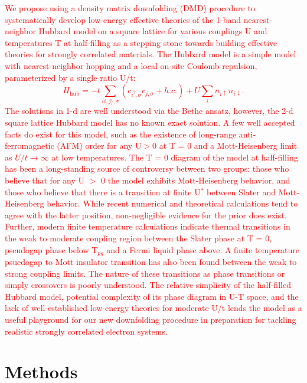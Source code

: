 \documentclass[12pt]{article}
\begin{document}
\textcolor{red}{
We propose using a density matrix downfolding (DMD) procedure to systematically develop low-energy effective theories of the 1-band nearest-neighbor Hubbard model on a square lattice for various couplings U and temperatures T at half-filling as a stepping stone towards building effective theories for strongly correlated materials. 
The Hubbard model is a simple model with nearest-neighbor hopping and a local on-site Coulomb repulsion, parameterized by a single ratio U/t: 
\begin{equation}
H_\text{hub} = -t \sum_{\langle i,j \rangle,\sigma}( c_{i^\dagger,\sigma} c_{j,\sigma} + h.c.) + U \sum_i n_{i\uparrow} n_{i\downarrow}
\label{hubbard}.
\end{equation}
The solutions in 1-d are well understood via the Bethe ansatz, however, the 2-d square lattice Hubbard model has no known exact solution.  
A few well accepted facts do exist for this model, such as the existence of long-range anti-ferromagnetic (AFM) order for any U$>$0 at T = 0 and a Mott-Heisenberg limit as $U/t \rightarrow \infty$ at low temperatures.
The T = 0 diagram of the model at half-filling has been a long-standing source of controversy between two groups:  those who believe that for any U $>$ 0 the model exhibits Mott-Heisenberg behavior, and those who believe that there is a transition at finite U$^*$ between Slater and Mott-Heisenberg behavior.
While recent numerical and theoretical calculations tend to agree with the latter position, non-negligible evidence for the prior does exist. 
Further, modern finite temperature calculations indicate thermal transitions in the weak to moderate coupling region between the Slater phase at T = 0, pseudogap phase below T$_{pg}$ and a Fermi liquid phase above.
A finite temperature psuedogap to Mott insulator transition has also been found between the weak to strong coupling limits.
The nature of these transitions as phase transitions or simply crossovers is poorly understood.
The relative simplicity of the half-filled Hubbard model, potential complexity of its phase diagram in U-T space,  and the lack of well-established low-energy theories for moderate U/t lends the model as a useful playground for our new downfolding procedure in preparation for tackling realistic strongly correlated electron systems. 
}

\section{Methods}
\end{document}
